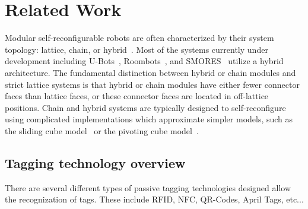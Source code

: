 \section{Related Work}
\label{sec:RelatedWork}

Modular self-reconfigurable robots are often characterized by their
system topology: lattice, chain, or hybrid~\cite{Yim-RAM07}.  Most of
the systems currently under development including U-Bots~\cite{ubot},
Roombots~\cite{roombots3}, and SMORES~\cite{Yim-RAM07} utilize a hybrid
architecture. The fundamental distinction between hybrid or chain modules and
strict lattice systems is that hybrid or chain modules have either fewer
connector faces than lattice faces, or these connector faces are
located in off-lattice positions.  Chain and hybrid
systems are typically designed to self-reconfigure using complicated
implementations which approximate simpler models, such as the sliding cube model~\cite{FitchRus-IROS03} or
the pivoting cube model~\cite{RomanishinRus-IROS13}.

\subsection{Tagging technology overview}

There are several different types of passive tagging technologies designed allow the recognization of tags. These include RFID, NFC, QR-Codes, April Tags, etc... 

